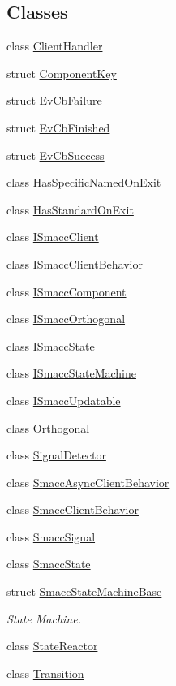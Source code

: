 \subsection*{Classes}
\begin{DoxyCompactItemize}
\item 
class \hyperlink{classsmacc_1_1ClientHandler}{Client\+Handler}
\item 
struct \hyperlink{structsmacc_1_1ComponentKey}{Component\+Key}
\item 
struct \hyperlink{structsmacc_1_1EvCbFailure}{Ev\+Cb\+Failure}
\item 
struct \hyperlink{structsmacc_1_1EvCbFinished}{Ev\+Cb\+Finished}
\item 
struct \hyperlink{structsmacc_1_1EvCbSuccess}{Ev\+Cb\+Success}
\item 
class \hyperlink{classsmacc_1_1HasSpecificNamedOnExit}{Has\+Specific\+Named\+On\+Exit}
\item 
class \hyperlink{classsmacc_1_1HasStandardOnExit}{Has\+Standard\+On\+Exit}
\item 
class \hyperlink{classsmacc_1_1ISmaccClient}{I\+Smacc\+Client}
\item 
class \hyperlink{classsmacc_1_1ISmaccClientBehavior}{I\+Smacc\+Client\+Behavior}
\item 
class \hyperlink{classsmacc_1_1ISmaccComponent}{I\+Smacc\+Component}
\item 
class \hyperlink{classsmacc_1_1ISmaccOrthogonal}{I\+Smacc\+Orthogonal}
\item 
class \hyperlink{classsmacc_1_1ISmaccState}{I\+Smacc\+State}
\item 
class \hyperlink{classsmacc_1_1ISmaccStateMachine}{I\+Smacc\+State\+Machine}
\item 
class \hyperlink{classsmacc_1_1ISmaccUpdatable}{I\+Smacc\+Updatable}
\item 
class \hyperlink{classsmacc_1_1Orthogonal}{Orthogonal}
\item 
class \hyperlink{classsmacc_1_1SignalDetector}{Signal\+Detector}
\item 
class \hyperlink{classsmacc_1_1SmaccAsyncClientBehavior}{Smacc\+Async\+Client\+Behavior}
\item 
class \hyperlink{classsmacc_1_1SmaccClientBehavior}{Smacc\+Client\+Behavior}
\item 
class \hyperlink{classsmacc_1_1SmaccSignal}{Smacc\+Signal}
\item 
class \hyperlink{classsmacc_1_1SmaccState}{Smacc\+State}
\item 
struct \hyperlink{structsmacc_1_1SmaccStateMachineBase}{Smacc\+State\+Machine\+Base}
\begin{DoxyCompactList}\small\item\em State Machine. \end{DoxyCompactList}\item 
class \hyperlink{classsmacc_1_1StateReactor}{State\+Reactor}
\item 
class \hyperlink{classsmacc_1_1Transition}{Transition}
\end{DoxyCompactItemize}
